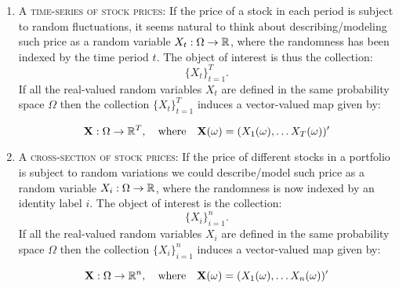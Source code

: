 \documentclass[11pt]{article} %
\begin{document}
\begin{enumerate}
\item {\scshape{A time-series of stock prices}}: If the price of a stock in each period is subject to random fluctuations, it seems natural to think about describing/modeling such price as a random variable $X_t:\Omega \rightarrow \mathbb{R}$, where the randomness has been indexed by the time period $t$. The object of interest is thus the collection:
$$\{X_t\}_{t=1}^{T}.$$
If all the real-valued random variables $X_t$ are defined in the same probability space $\Omega$ then the collection $\{X_t\}_{t=1}^{T}$ induces a vector-valued map given by:

$$\textbf{X}: \Omega \rightarrow \mathbb{R}^{T}, \quad \text{where} \quad \textbf{X}(\omega) = (X_1(\omega), \ldots X_{T}(\omega))' $$ 







\item {\scshape {A cross-section of stock prices:}} If the price of different stocks in a portfolio is subject to random variations we could describe/model such price as a random variable $X_i:\Omega \rightarrow \mathbb{R}$, where the randomness is now indexed by an identity label $i$. The object of interest is the collection:
$$\{X_i\}_{i=1}^{n}.$$
If all the real-valued random variables $X_i$ are defined in the same probability space $\Omega$ then the collection $\{X_i\}_{i=1}^{n}$ induces a vector-valued map given by:

$$\textbf{X}: \Omega \rightarrow \mathbb{R}^{n}, \quad \text{where} \quad \textbf{X}(\omega) = (X_1(\omega), \ldots X_{n}(\omega))' $$ 


\end{enumerate}
\end{document}
